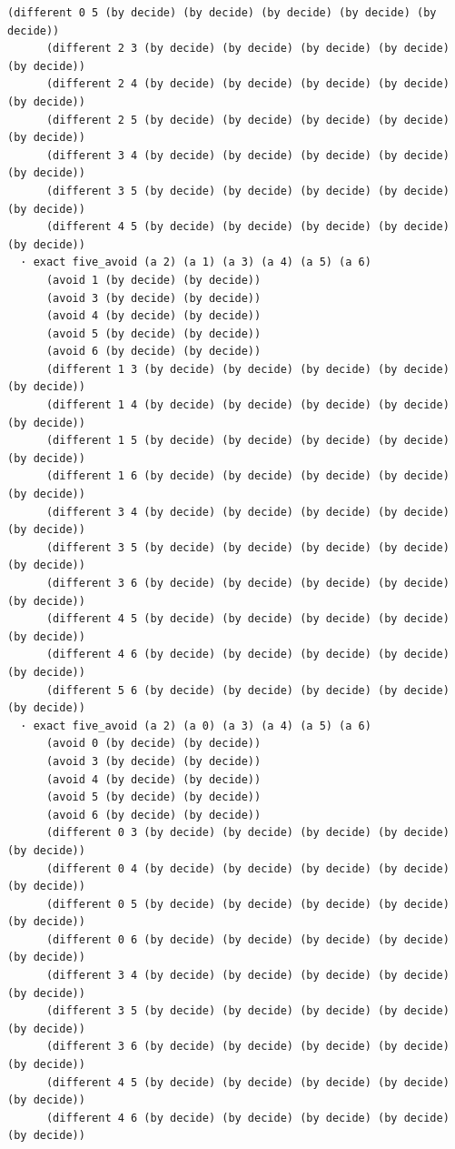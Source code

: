 \documentclass[11pt,a4paper]{article}
\begin{document}
\begin{Verbatim}[breaklines,breakanywhere,fontsize=\footnotesize]
      (different 0 5 (by decide) (by decide) (by decide) (by decide) (by decide))
      (different 2 3 (by decide) (by decide) (by decide) (by decide) (by decide))
      (different 2 4 (by decide) (by decide) (by decide) (by decide) (by decide))
      (different 2 5 (by decide) (by decide) (by decide) (by decide) (by decide))
      (different 3 4 (by decide) (by decide) (by decide) (by decide) (by decide))
      (different 3 5 (by decide) (by decide) (by decide) (by decide) (by decide))
      (different 4 5 (by decide) (by decide) (by decide) (by decide) (by decide))
  · exact five_avoid (a 2) (a 1) (a 3) (a 4) (a 5) (a 6)
      (avoid 1 (by decide) (by decide))
      (avoid 3 (by decide) (by decide))
      (avoid 4 (by decide) (by decide))
      (avoid 5 (by decide) (by decide))
      (avoid 6 (by decide) (by decide))
      (different 1 3 (by decide) (by decide) (by decide) (by decide) (by decide))
      (different 1 4 (by decide) (by decide) (by decide) (by decide) (by decide))
      (different 1 5 (by decide) (by decide) (by decide) (by decide) (by decide))
      (different 1 6 (by decide) (by decide) (by decide) (by decide) (by decide))
      (different 3 4 (by decide) (by decide) (by decide) (by decide) (by decide))
      (different 3 5 (by decide) (by decide) (by decide) (by decide) (by decide))
      (different 3 6 (by decide) (by decide) (by decide) (by decide) (by decide))
      (different 4 5 (by decide) (by decide) (by decide) (by decide) (by decide))
      (different 4 6 (by decide) (by decide) (by decide) (by decide) (by decide))
      (different 5 6 (by decide) (by decide) (by decide) (by decide) (by decide))
  · exact five_avoid (a 2) (a 0) (a 3) (a 4) (a 5) (a 6)
      (avoid 0 (by decide) (by decide))
      (avoid 3 (by decide) (by decide))
      (avoid 4 (by decide) (by decide))
      (avoid 5 (by decide) (by decide))
      (avoid 6 (by decide) (by decide))
      (different 0 3 (by decide) (by decide) (by decide) (by decide) (by decide))
      (different 0 4 (by decide) (by decide) (by decide) (by decide) (by decide))
      (different 0 5 (by decide) (by decide) (by decide) (by decide) (by decide))
      (different 0 6 (by decide) (by decide) (by decide) (by decide) (by decide))
      (different 3 4 (by decide) (by decide) (by decide) (by decide) (by decide))
      (different 3 5 (by decide) (by decide) (by decide) (by decide) (by decide))
      (different 3 6 (by decide) (by decide) (by decide) (by decide) (by decide))
      (different 4 5 (by decide) (by decide) (by decide) (by decide) (by decide))
      (different 4 6 (by decide) (by decide) (by decide) (by decide) (by decide))

\end{Verbatim}
\end{document}
